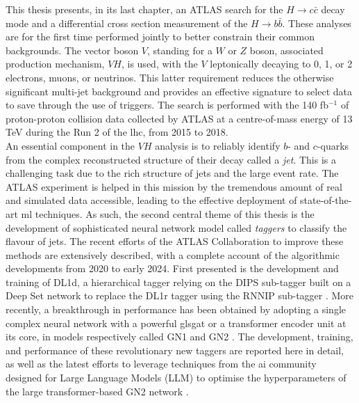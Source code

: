 \newpage
This thesis presents, in its last chapter, an ATLAS search for the $H \rightarrow c\bar{c}$ decay mode and a differential cross section measurement of the $H \rightarrow b\bar{b}$. These analyses are for the first time performed jointly to better constrain their common backgrounds. The vector boson $V$, standing for a $W$ or $Z$ boson, associated production mechanism, $VH$, is used, with the $V$ leptonically decaying to 0, 1, or 2 electrons, muons, or neutrinos. This latter requirement reduces the otherwise significant multi-jet background and provides an effective signature to select data to save through the use of triggers. The search is performed with the 140 fb$^{-1}$ of proton-proton collision data collected by ATLAS at a centre-of-mass energy of 13 TeV during the Run 2 of the \gls{lhc}, from 2015 to 2018. \\

An essential component in the $VH$ analysis is to reliably identify $b$- and $c$-quarks from the complex reconstructed structure of their decay called a \textit{jet}. This is a challenging task due to the rich structure of jets and the large event rate. The ATLAS experiment is helped in this mission by the tremendous amount of real and simulated data accessible, leading to the effective deployment of state-of-the-art \gls{ml} techniques. As such, the second central theme of this thesis is the development of sophisticated neural network model called \textit{taggers} to classify the flavour of jets. The recent efforts of the ATLAS Collaboration to improve these methods are extensively described, with a complete account of the algorithmic developments from 2020 to early 2024. First presented is the development and training of DL1d, a hierarchical tagger relying on the DIPS sub-tagger built on a Deep Set network to replace the DL1r tagger using the RNNIP sub-tagger \cite{ATL-PLOT-FTAG-2023-01}. More recently, a breakthrough in performance has been obtained by adopting a single complex neural network with a powerful gls{gat} or a transformer encoder unit at its core, in models respectively called GN1 \cite{ATL-PHYS-PUB-2022-027} and GN2 \cite{duperrin2023flavour}. The development, training, and performance of these revolutionary new taggers are reported here in detail, as well as the latest efforts to leverage techniques from the \gls{ai} community designed for Large Language Models (LLM) to optimise the hyperparameters of the large transformer-based GN2 network \cite{yang2021tuning, publicplotMUP}. \\

